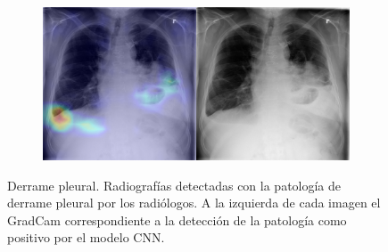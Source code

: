 \begin{figure}[b]
\begin{subfigure}{0.4\textwidth}
    \end{subfigure}
    \begin{subfigure}{0.4\textwidth}
        \centering
        \includegraphics[width=1.0\textwidth]{Chapters/5. Conclusiones/img/Effusion/1_1_00022899_009.png}
    \end{subfigure}

    \caption[short]{Derrame pleural. Radiografías detectadas con la patología de derrame pleural por los
                    radiólogos. A la izquierda de cada imagen el GradCam correspondiente a la detección
                    de la patología como positivo por el modelo CNN.}
\end{figure}


